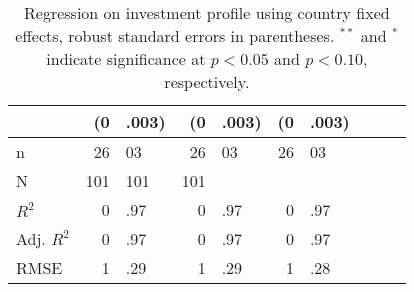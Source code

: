 \begin{table}[ht]
{\begin{tabular}{lr@{} lr@{}lr@{}lr@{}lr@{}}
   & (0&.003) & (0&.003) & (0&.003) \\ 
   \hline
n & 26&03 & 26&03 & 26&03 \\ 
  N & 101 & 101 & 101 \\ 
  $R^{2}$ & 0&.97 & 0&.97 & 0&.97 \\ 
  Adj. $R^{2}$ & 0&.97 & 0&.97 & 0&.97 \\ 
  RMSE & 1&.29 & 1&.29 & 1&.28 \\ 
   \hline
\hline
\end{tabular}
}
\caption{Regression on investment profile using country fixed effects, robust standard errors in parentheses. $^{**}$ and $^{*}$ indicate significance at $p< 0.05 $ and $p< 0.10 $, respectively.} 
\end{table}